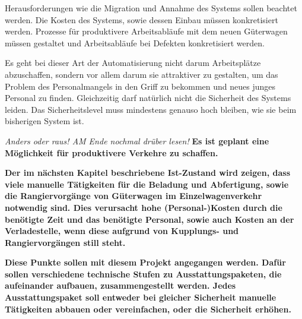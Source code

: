 Herausforderungen wie die Migration und Annahme des Systems sollen beachtet werden. Die Kosten des Systems, sowie dessen Einbau müssen konkretisiert werden. Prozesse für produktivere Arbeitsabläufe mit dem neuen Güterwagen müssen gestaltet und Arbeitsabläufe bei Defekten konkretisiert werden.\par
Es geht bei dieser Art der Automatisierung nicht darum Arbeitsplätze abzuschaffen, sondern vor allem darum sie attraktiver zu gestalten, um das Problem des Personalmangels in den Griff zu bekommen und neues junges Personal zu finden. Gleichzeitig darf natürlich nicht die Sicherheit des Systems leiden. Das Sicherheitslevel muss mindestens genauso hoch bleiben, wie sie beim bisherigen System ist.\par
\textit{Anders oder raus! AM Ende nochmal drüber lesen!}
\textbf{Es ist geplant eine Möglichkeit für produktivere Verkehre zu schaffen.}\par
\textbf{Der im nächsten Kapitel beschriebene Ist-Zustand wird zeigen, dass viele manuelle Tätigkeiten für die Beladung und Abfertigung, sowie die Rangiervorgänge von Güterwagen im Einzelwagenverkehr notwendig sind. Dies verursacht hohe (Personal-)Kosten durch die benötigte Zeit und das benötigte Personal, sowie auch Kosten an der Verladestelle, wenn diese aufgrund von Kupplungs- und Rangiervorgängen still steht.}\par
\textbf{Diese Punkte sollen mit diesem Projekt angegangen werden. Dafür sollen verschiedene technische Stufen zu Ausstattungspaketen, die aufeinander aufbauen, zusammengestellt werden. Jedes Ausstattungspaket soll entweder bei gleicher Sicherheit manuelle Tätigkeiten abbauen oder vereinfachen, oder die Sicherheit erhöhen.}\par


